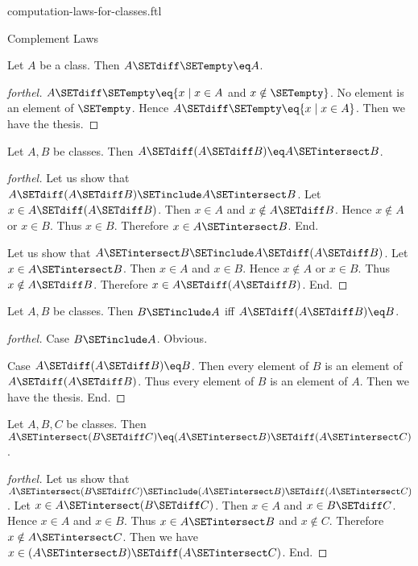 \documentclass{naproche-library}
\begin{document}
\begin{smodule}[title=Computation Laws For Classes]{computation-laws-for-classes.ftl}
\begin{sfragment}{Complement Laws}
  \begin{proposition}[forthel,id=FOUNDATIONS_02_3783696985358336]
    Let $A$ be a class.
    Then $A \SETdiff \SETempty \eq A$.
  \end{proposition}
  \begin{proof}[forthel]
    $A \SETdiff \SETempty \eq \{ x \mid x \in A$ and $x \notin \SETempty \}$.
    No element is an element of $\SETempty$.
    Hence $A \SETdiff \SETempty \eq \{ x \mid x \in A \}$.
    Then we have the thesis.
  \end{proof}

  \begin{proposition}[forthel,id=FOUNDATIONS_02_7083929257377792]
    Let $A, B$ be classes.
    Then $A \SETdiff (A \SETdiff B) \eq A \SETintersect B$.
  \end{proposition}
  \begin{proof}[forthel]
    Let us show that $A \SETdiff (A \SETdiff B) \SETinclude A \SETintersect B$.
      Let $x \in A \SETdiff (A \SETdiff B)$.
      Then $x \in A$ and $x \notin A \SETdiff B$.
      Hence $x \notin A$ or $x \in B$.
      Thus $x \in B$.
      Therefore $x \in A \SETintersect B$.
    End.

    Let us show that $A \SETintersect B \SETinclude A \SETdiff (A \SETdiff B)$.
      Let $x \in A \SETintersect B$.
      Then $x \in A$ and $x \in B$.
      Hence $x \notin A$ or $x \in B$.
      Thus $x \notin A \SETdiff B$.
      Therefore $x \in A \SETdiff (A \SETdiff B)$.
    End.
  \end{proof}

  \begin{proposition}[forthel,id=FOUNDATIONS_02_4938646769631232]
    Let $A, B$ be classes.
    Then $B \SETinclude A$ iff $A \SETdiff (A \SETdiff B) \eq B$.
  \end{proposition}
  \begin{proof}[forthel]
    Case $B \SETinclude A$. Obvious.

    Case $A \SETdiff (A \SETdiff B) \eq B$.
      Then every element of $B$ is an element of $A \SETdiff (A \SETdiff B)$.
      Thus every element of $B$ is an element of $A$.
      Then we have the thesis.
    End.
  \end{proof}

  \begin{proposition}[forthel,id=FOUNDATIONS_02_5811954316738560]
    Let $A, B, C$ be classes.
    Then $A \SETintersect (B \SETdiff C) \eq (A \SETintersect B) \SETdiff (A \SETintersect C)$.
  \end{proposition}
  \begin{proof}[forthel]
    Let us show that $A \SETintersect (B \SETdiff C) \SETinclude (A \SETintersect B) \SETdiff (A \SETintersect C)$.
      Let $x \in A \SETintersect (B \SETdiff C)$.
      Then $x \in A$ and $x \in B \SETdiff C$.
      Hence $x \in A$ and $x \in B$.
      Thus $x \in A \SETintersect B$ and $x \notin C$.
      Therefore $x \notin A \SETintersect C$.
      Then we have $x \in (A \SETintersect B) \SETdiff (A \SETintersect C)$.
    End.


\end{proof}
\end{sfragment}
\end{smodule}
\end{document}
